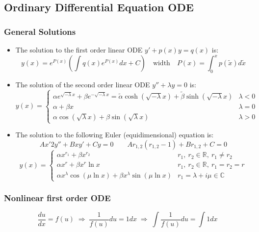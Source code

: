 \documentclass[a4paper]{article}
\begin{document}
\begin{twocolumn}
\subsection{Ordinary Differential Equation ODE}

\subsubsection{General Solutions}

\begin{itemize}

\item The solution to the first order linear ODE $y' + p(x) y = q(x)$ is:
$$y(x) = e^{P(x)} \left( \int q(x) e^{P(x)} dx + C \right) \quad \text{width} \quad P(x) = \int_{0}^{x} p(\tilde x) d\tilde x$$

\item The solution of the second order linear ODE $y'' + \lambda y = 0$ is:
$$y(x) = \begin{cases} \alpha e^{\sqrt{-\lambda} x} + \beta e^{-\sqrt{-\lambda} x} = \tilde \alpha \cosh \left( \sqrt{-\lambda} x \right) +\tilde \beta \sinh \left( \sqrt{-\lambda} x \right) & \lambda < 0\\
\alpha + \beta x & \lambda = 0 \\ \alpha \cos \left( \sqrt{\lambda} x \right) + \beta \sin \left( \sqrt{\lambda} x \right) & \lambda > 0 \end{cases}$$

\item The solution to the following Euler (equidimensional) equation is:
$$A x'2 y'' + B x y' + C y = 0 \qquad A r_{1,2}(r_{1,2}-1) + B r_{1,2} + C = 0$$
$$y(x) = \begin{cases}
\alpha x^{r_1} + \beta x^{r_2} & r_1, \ r_2 \in \mathbb{R},\  r_1 \neq r_2 \\
\alpha x^r + \beta x^r \ln x & r_1, \ r_2 \in \mathbb{R}, \ r_1 = r_2 = r \\
\alpha x^\lambda \cos \left( \mu \ln x \right) +\beta x^\lambda \sin \left( \mu \ln x \right) & r_1 = \lambda + i \mu \in \mathbb{C}
\end{cases}$$

\end{itemize}

\subsubsection{Nonlinear first order ODE}

$$\frac{du}{dx} = f(u) \;\Rightarrow\; \frac{1}{f(u)} du = 1 dx \;\Rightarrow\; \int \frac{1}{f(u)} du = \int 1 dx $$


\end{twocolumn}
\end{document}
